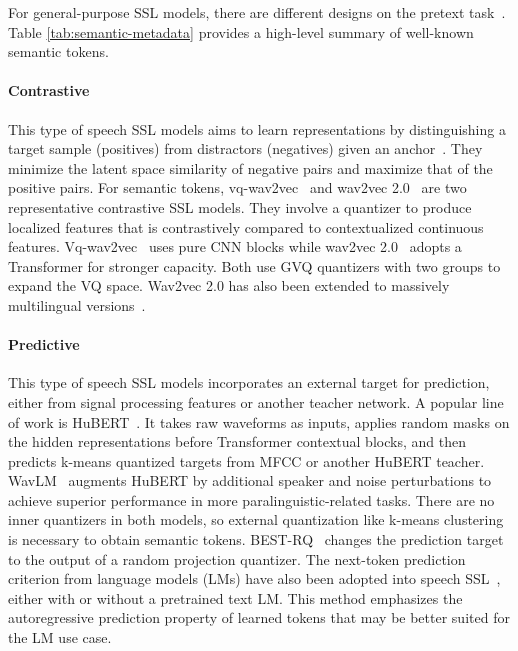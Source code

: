 For general-purpose SSL models, there are different designs on the pretext task~\cite{mohamed2022self}.
Table \ref{tab:semantic-metadata} provides a high-level summary of well-known semantic tokens.

\paragraph{Contrastive} This type of speech SSL models aims to learn representations by distinguishing a target sample (positives) from distractors (negatives) given an anchor~\cite{mohamed2022self}.
They minimize the latent space similarity of negative pairs and maximize that of the positive pairs.
For semantic tokens, vq-wav2vec~\cite{vq-wav2vec} and wav2vec 2.0~\cite{baevski2020wav2vec} are two representative contrastive SSL models.
They involve a quantizer to produce localized features that is contrastively compared to contextualized continuous features.
Vq-wav2vec~\cite{vq-wav2vec} uses pure CNN blocks while wav2vec 2.0~\cite{baevski2020wav2vec} adopts a Transformer for stronger capacity.
Both use GVQ quantizers with two groups to expand the VQ space.
Wav2vec 2.0 has also been extended to massively multilingual versions~\cite{conneau21_interspeech,babu22_interspeech,pratap2024scaling}.

\paragraph{Predictive}
This type of speech SSL models incorporates an external target for prediction, either from signal processing features or another teacher network.
A popular line of work is HuBERT~\cite{hsu2021hubert}.
It takes raw waveforms as inputs, applies random masks on the hidden representations before Transformer contextual blocks, and then predicts k-means quantized targets from MFCC or another HuBERT teacher.
WavLM~\cite{chen2022wavlm} augments HuBERT by additional speaker and noise perturbations to achieve superior performance in more paralinguistic-related tasks.
There are no inner quantizers in both models, so external quantization like k-means clustering is necessary to obtain semantic tokens.
BEST-RQ~\cite{chiu2022self} changes the prediction target to the output of a random projection quantizer.
The next-token prediction criterion from language models (LMs) have also been adopted into speech SSL~\cite{turetzky2024last,han2024nest}, either with or without a pretrained text LM.
This method emphasizes the autoregressive prediction property of learned tokens that may be better suited for the LM use case.

